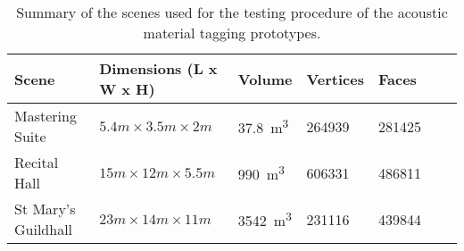 \begin{table}[htbp]
\centering
\begin{tabular}{@{}lllllll@{}}
\toprule
Scene               & Dimensions (L x W x H)         & Volume                      & Vertices & Faces   \\ \midrule
Mastering Suite     & $5.4m \times 3.5m \times 2m$ & \qty{37.8}{\metre\tothe{3}} & 264939   & 281425  \\
Recital Hall        & $15m \times12m \times 5.5m$    & \qty{990}{\metre\tothe{3}}  & 606331   & 486811  \\
St Mary's Guildhall & $23m \times14m \times 11m $    & \qty{3542}{\metre\tothe{3}} & 231116   & 439844  \\ \bottomrule
\end{tabular}
\caption{Summary of the scenes used for the testing procedure of the acoustic material tagging prototypes.}
\label{tab:material-eval-scenes}
\end{table}